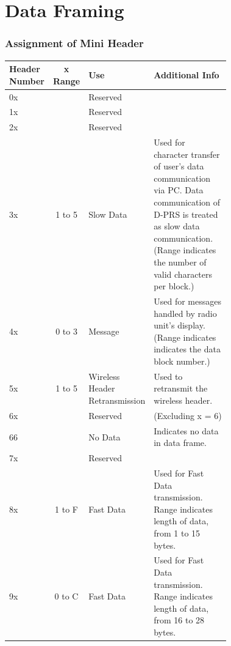 \documentclass[10pt]{report}
\begin{document}
\setcounter{chapter}{5}
\chapter{Data Framing}

\setcounter{section}{1}
\setcounter{subsection}{2}
\subsection{Assignment of Mini Header} \label{mini-header}

\begin{table}[h]
  \begin{tabular}{|p{0.07\linewidth}|c|p{0.15\linewidth}|p{0.5\linewidth}|}
    \hline
    Header Number & x Range & Use & Additional Info \\
    \hline
    \hline
    0x &        & Reserved & \\ \hline
    1x &        & Reserved & \\ \hline
    2x &        & Reserved & \\ \hline
    
    3x & 1 to 5 & Slow Data & Used for character transfer of user's
    data communication via PC.  Data communication of D-PRS is treated
    as slow data communication.  (Range indicates the number of valid
    characters per block.) \\ \hline

    4x & 0 to 3 & Message & Used for messages handled by radio unit's
    display.  (Range indicates indicates the data block number.)
    \\ \hline

    5x & 1 to 5 & Wireless Header Retransmission & Used to retransmit
    the wireless header. \\ \hline

    6x &        & Reserved & (Excluding x = 6) \\ \hline
    66 &        & No Data  & Indicates no data in data frame. \\ \hline
    7x &        & Reserved & \\ \hline
    
    8x & 1 to F & Fast Data & Used for Fast Data transmission.  Range
    indicates length of data, from 1 to 15 bytes. \\ \hline
    
    9x & 0 to C & Fast Data & Used for Fast Data transmission.  Range
    indicates length of data, from 16 to 28 bytes. \\ \hline


\end{tabular}
\end{table}
\end{document}
